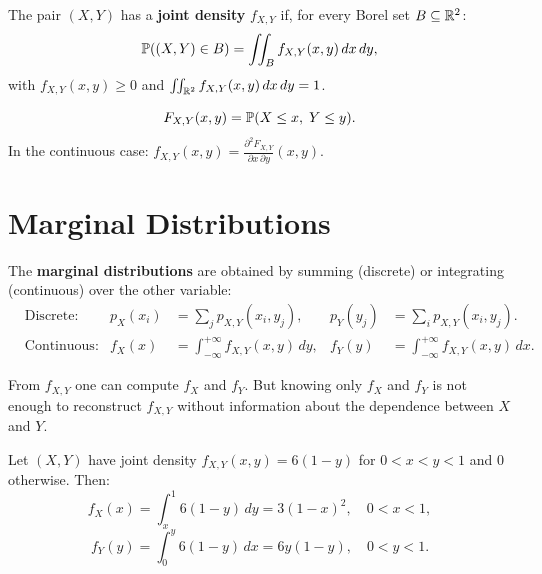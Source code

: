 \begin{definition}
The pair $(X, Y)$ has a \textbf{joint density} $f_{X,Y}$ if, for every Borel set
$B \subseteq \mathbb{R}^2$:
\[
    \mathbb{P}((X,Y) \in B) = \iint_B f_{X,Y}(x, y)\,dx\,dy,
\]
with $f_{X,Y}(x,y) \geq 0$ and $\iint_{\mathbb{R}^2} f_{X,Y}(x,y)\,dx\,dy = 1$.
\end{definition}

\begin{definition}
\[
    F_{X,Y}(x, y) = \mathbb{P}(X \leq x,\; Y \leq y).
\]
In the continuous case: $f_{X,Y}(x,y) = \frac{\partial^2 F_{X,Y}}{\partial x\,\partial y}(x,y)$.
\end{definition}

\section{Marginal Distributions}

\begin{definition}[Marginals]
The \textbf{marginal distributions} are obtained by summing (discrete) or
integrating (continuous) over the other variable:
\begin{align*}
    &\text{Discrete:} & p_X(x_i) &= \sum_j p_{X,Y}(x_i, y_j), &
    p_Y(y_j) &= \sum_i p_{X,Y}(x_i, y_j). \\
    &\text{Continuous:} & f_X(x) &= \int_{-\infty}^{+\infty} f_{X,Y}(x,y)\,dy, &
    f_Y(y) &= \int_{-\infty}^{+\infty} f_{X,Y}(x,y)\,dx.
\end{align*}
\end{definition}

\begin{warning}[title=\textbf{The joint determines the marginals, but not vice versa}]
From $f_{X,Y}$ one can compute $f_X$ and $f_Y$. But knowing only $f_X$ and $f_Y$
is not enough to reconstruct $f_{X,Y}$ without information about the dependence
between $X$ and $Y$.
\end{warning}

\begin{example}
Let $(X,Y)$ have joint density $f_{X,Y}(x,y) = 6(1-y)$ for $0 < x < y < 1$
and $0$ otherwise. Then:
\[
    f_X(x) = \int_x^1 6(1-y)\,dy = 3(1-x)^2, \quad 0 < x < 1,
\]
\[
    f_Y(y) = \int_0^y 6(1-y)\,dx = 6y(1-y), \quad 0 < y < 1.
\]
\end{example}


